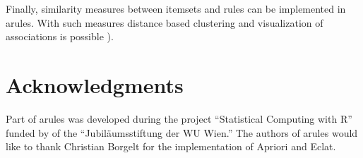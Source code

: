 \documentclass[10pt,a4paper]{article}
\newcommand{\strong}[1]{{\normalfont\fontseries{b}\selectfont #1}}
\newcommand{\pkg}[1]{\strong{#1}}
\begin{document}
Finally, similarity measures between itemsets and rules can be
implemented in \pkg{arules}. With such measures distance based
clustering and visualization of associations is possible 
\citep[see e.g.,][]{arules:Strehl+Gosh:2003}).

\section*{Acknowledgments}
Part of \pkg{arules} was developed  during the project 
``Statistical Computing with R'' funded by  of the
``Jubil\"aumsstiftung der WU Wien.''
The authors of \pkg{arules} would like to thank Christian Borgelt for the
implementation of Apriori and Eclat.




\end{document}
